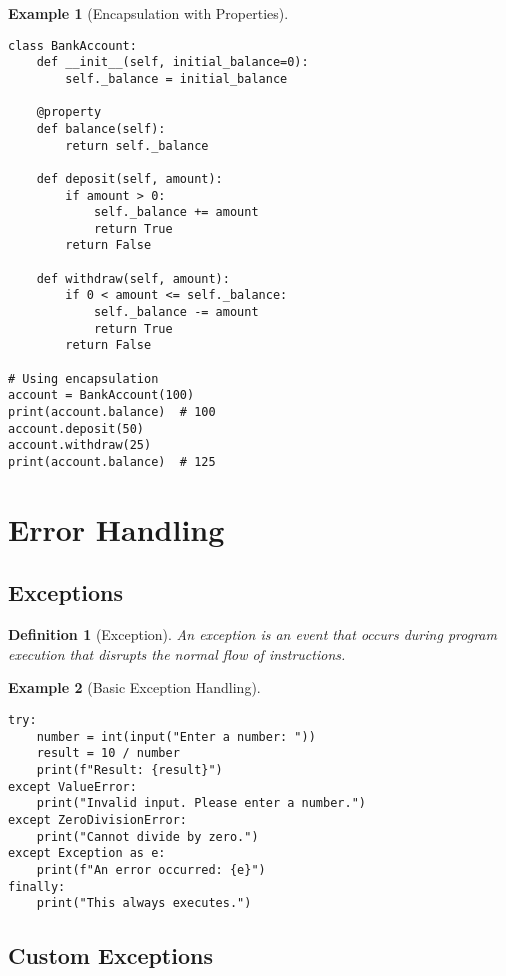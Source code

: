 \documentclass[11pt]{article}
\newtheorem{definition}{Definition}[section]
\newtheorem{example}{Example}[section]
\begin{document}
\begin{example}[Encapsulation with Properties]
\begin{lstlisting}
class BankAccount:
    def __init__(self, initial_balance=0):
        self._balance = initial_balance
    
    @property
    def balance(self):
        return self._balance
    
    def deposit(self, amount):
        if amount > 0:
            self._balance += amount
            return True
        return False
    
    def withdraw(self, amount):
        if 0 < amount <= self._balance:
            self._balance -= amount
            return True
        return False

# Using encapsulation
account = BankAccount(100)
print(account.balance)  # 100
account.deposit(50)
account.withdraw(25)
print(account.balance)  # 125
\end{lstlisting}
\end{example}

\section{Error Handling}

\subsection{Exceptions}

\begin{definition}[Exception]
An exception is an event that occurs during program execution that disrupts the normal flow of instructions.
\end{definition}

\begin{example}[Basic Exception Handling]
\begin{lstlisting}
try:
    number = int(input("Enter a number: "))
    result = 10 / number
    print(f"Result: {result}")
except ValueError:
    print("Invalid input. Please enter a number.")
except ZeroDivisionError:
    print("Cannot divide by zero.")
except Exception as e:
    print(f"An error occurred: {e}")
finally:
    print("This always executes.")
\end{lstlisting}
\end{example}

\subsection{Custom Exceptions}
\end{document}
